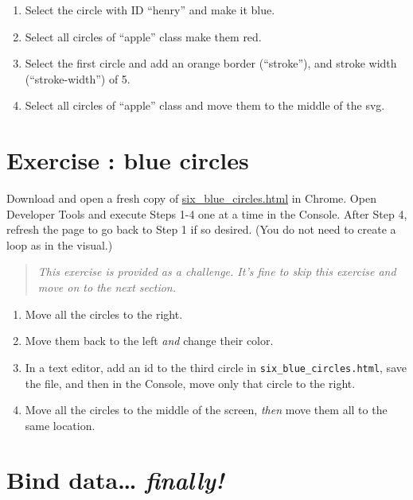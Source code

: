 \documentclass[openany]{book}
\begin{document}
\begin{enumerate}
\def\labelenumi{\arabic{enumi}.}
\item
  Select the circle with ID ``henry'' and make it blue.
\item
  Select all circles of ``apple'' class make them red.
\item
  Select the first circle and add an orange border (``stroke''), and stroke width (``stroke-width'') of 5.
\item
  Select all circles of ``apple'' class and move them to the middle of the svg.
\end{enumerate}

\protect\hyperlink{d3-in-the-console-green-circles}{}

\hypertarget{exercise-blue-circles}{%
\section{\texorpdfstring{Exercise : blue circles}{Exercise  : blue circles}}\label{exercise-blue-circles}}

Download and open a fresh copy of \href{https://raw.githubusercontent.com/jtr13/d3book/master/code/six_blue_circles.html}{six\_blue\_circles.html} in Chrome. Open Developer Tools and execute Steps 1-4 one at a time in the Console. After Step 4, refresh the page to go back to Step 1 if so desired. (You do not need to create a loop as in the visual.)

\begin{quote}
 \emph{This exercise is provided as a challenge. It's fine to skip this exercise and move on to the next section.}
\end{quote}

\begin{enumerate}
\def\labelenumi{\arabic{enumi}.}
\item
  Move all the circles to the right.
\item
  Move them back to the left \emph{and} change their color.
\item
  In a text editor, add an id to the third circle in \texttt{six\_blue\_circles.html}, save the file, and then in the Console, move only that circle to the right.
\item
  Move all the circles to the middle of the screen, \emph{then} move them all to the same location.
\end{enumerate}

\protect\hyperlink{d3-in-the-console-blue-circles}{}

\hypertarget{bind-data-finally}{%
\section{\texorpdfstring{Bind data\ldots{} \emph{finally!} }{Bind data\ldots{} finally! }}\label{bind-data-finally}}
\end{document}
